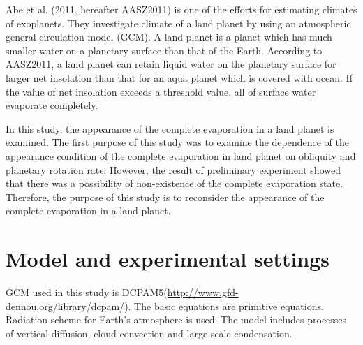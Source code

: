 \documentclass[dvipdfmx,twocolumn,10pt]{jsarticle}
\begin{document}
Abe et al. (2011, hereafter AASZ2011) is one of the efforts for estimating climates of exoplanets. 
They investigate climate of a land planet by using an atmospheric general circulation model (GCM). 
A land planet is a planet which has much smaller water on a planetary surface than that of the Earth. 
According to AASZ2011, a land planet can retain liquid water on the planetary surface for larger net insolation than that for an aqua planet which is covered with ocean. 
If the value of net insolation exceeds a threshold value, all of surface water evaporate completely. 

In this study, the appearance of the complete evaporation in a land planet is examined. 
The first purpose of this study was to examine the dependence of the appearance condition of the complete evaporation in land planet on obliquity and planetary rotation rate. 
However, the result of preliminary experiment showed that there was a possibility of non-existence of the complete evaporation state. 
Therefore, the purpose of this study is to reconsider the appearance of the complete evaporation in a land planet. 

\vspace{-0.2zh}
\section{Model and experimental settings}
\vspace{-0.5zh}
GCM used in this study is DCPAM5(\url{http://www.gfd-dennou.org/library/dcpam/}). 
The basic equations are primitive equations. 
Radiation scheme for Earth's atmosphere is used. 
The model includes processes of vertical diffusion, cloud convection and large scale condensation. 
\end{document}
